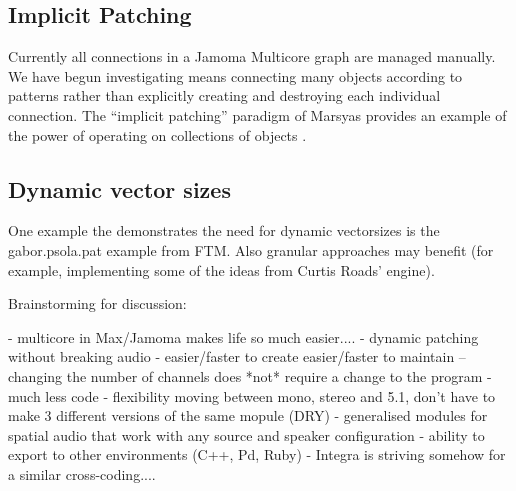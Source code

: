 \documentclass[twoside,a4paper]{article}
\begin{document}


\subsection{Implicit Patching} %

Currently all connections in a Jamoma Multicore graph are managed manually.  
We have begun investigating means connecting many objects according to patterns rather than explicitly creating and destroying each individual connection.  
The ``implicit patching'' paradigm of Marsyas provides an example of the power of operating on collections of objects \cite{Bray:2005}.





\subsection{Dynamic vector sizes} %

One example the demonstrates the need for dynamic vectorsizes is the gabor.psola.pat example from FTM. 
Also granular approaches may benefit (for example, implementing some of the ideas from Curtis Roads' engine).


Brainstorming for discussion:


- multicore in Max/Jamoma makes life so much easier....
    - dynamic patching without breaking audio
    - easier/faster to create easier/faster to maintain -- changing the number of channels does *not* require a change to the program
    - much less code 
    - flexibility moving between mono, stereo and 5.1, don't have to make 3 different versions of the same mopule (DRY)
    - generalised modules for spatial audio that work with any source and speaker configuration
    - ability to export to other environments (C++, Pd, Ruby)
    - Integra is striving somehow for a similar cross-coding....
\end{document}
